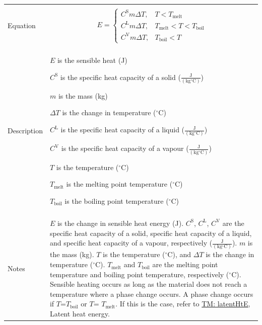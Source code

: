 \documentclass[12pt]{article}
\begin{document}
\begin{minipage}{\textwidth}
\begin{tabular}{>{\raggedright}p{}>{\raggedright\arraybackslash}p{}}
\\ \midrule \\
Equation & \begin{displaymath}
           E=\begin{cases}
             {C^{\text{S}}} m ΔT, & T<{T_{\text{melt}}}\\
             {C^{\text{L}}} m ΔT, & {T_{\text{melt}}}<T<{T_{\text{boil}}}\\
             {C^{\text{V}}} m ΔT, & {T_{\text{boil}}}<T
             \end{cases}
           \end{displaymath}
\\ \midrule \\
Description & \begin{symbDescription}
              \item{$E$ is the sensible heat (J)}
              \item{${C^{\text{S}}}$ is the specific heat capacity of a solid ($\frac{\text{J}}{(\text{kg}{}^{\circ}\text{C})}$)}
              \item{$m$ is the mass (kg)}
              \item{$ΔT$ is the change in temperature (${}^{\circ}$C)}
              \item{${C^{\text{L}}}$ is the specific heat capacity of a liquid ($\frac{\text{J}}{(\text{kg}{}^{\circ}\text{C})}$)}
              \item{${C^{\text{V}}}$ is the specific heat capacity of a vapour ($\frac{\text{J}}{(\text{kg}{}^{\circ}\text{C})}$)}
              \item{$T$ is the temperature (${}^{\circ}$C)}
              \item{${T_{\text{melt}}}$ is the melting point temperature (${}^{\circ}$C)}
              \item{${T_{\text{boil}}}$ is the boiling point temperature (${}^{\circ}$C)}
              \end{symbDescription}
\\ \midrule \\
Notes & $E$ is the change in sensible heat energy (J). ${C^{\text{S}}}$, ${C^{\text{L}}}$, ${C^{\text{V}}}$ are the specific heat capacity of a solid, specific heat capacity of a liquid, and specific heat capacity of a vapour, respectively ($\frac{\text{J}}{(\text{kg}{}^{\circ}\text{C})}$). $m$ is the mass (kg). $T$ is the temperature (${}^{\circ}$C), and $ΔT$ is the change in temperature (${}^{\circ}$C). ${T_{\text{melt}}}$ and ${T_{\text{boil}}}$ are the melting point temperature and boiling point temperature, respectively (${}^{\circ}$C). Sensible heating occurs as long as the material does not reach a temperature where a phase change occurs. A phase change occurs if $T$=${T_{\text{boil}}}$ or $T$= ${T_{\text{melt}}}$. If this is the case, refer to \hyperref[TM:latentHtE]{TM: latentHtE}, Latent heat energy.
        

\end{tabular}
\end{minipage}
\end{document}
